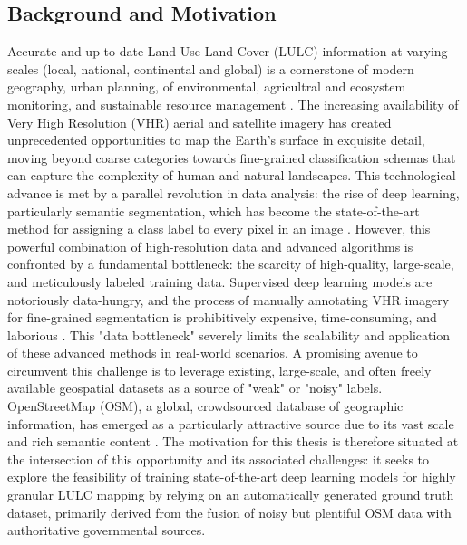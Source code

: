 \documentclass{report}
\begin{document}
\subsection{Background and Motivation}
Accurate and up-to-date Land Use Land Cover (LULC) information at varying scales (local, national, continental and global) is a cornerstone of modern geography, urban planning, of environmental, agricultral and ecosystem monitoring, and sustainable resource management \parencites[p.~2;]{TalukdarEtAlLandUseLandCoverClassificationMachineLearningClassifiersSatelliteObservationsReview2020}[p.~47]{KandzioraEtAlMappingprovisioningecosystemserviceslocalscaleusingdatavaryingspatialtemporalresolution2013}. The increasing availability of Very High Resolution (VHR) aerial and satellite imagery has created unprecedented opportunities to map the Earth's surface in exquisite detail, moving beyond coarse categories towards fine-grained classification schemas that can capture the complexity of human and natural landscapes. This technological advance is met by a parallel revolution in data analysis: the rise of deep learning, particularly semantic segmentation, which has become the state-of-the-art method for assigning a class label to every pixel in an image \parencite[p.~311f.]{KotaridisLazaridouRemotesensingimagesegmentationadvancesmetaanalysis2021a}.
However, this powerful combination of high-resolution data and advanced algorithms is confronted by a fundamental bottleneck: the scarcity of high-quality, large-scale, and meticulously labeled training data. Supervised deep learning models are notoriously data-hungry, and the process of manually annotating VHR imagery for fine-grained segmentation is prohibitively expensive, time-consuming, and laborious \parencite[p.~1]{KaiserEtAlLearningAerialImageSegmentationOnlineMaps2017}. This "data bottleneck" severely limits the scalability and application of these advanced methods in real-world scenarios.
A promising avenue to circumvent this challenge is to leverage existing, large-scale, and often freely available geospatial datasets as a source of "weak" or "noisy" labels. OpenStreetMap (OSM), a global, crowdsourced database of geographic information, has emerged as a particularly attractive source due to its vast scale and rich semantic content \parencite[p.~2]{UsmaniEtAlRemoteSensingDeepLearningUnderstandNoisyOpenStreetMap2023}. The motivation for this thesis is therefore situated at the intersection of this opportunity and its associated challenges: it seeks to explore the feasibility of training state-of-the-art deep learning models for highly granular LULC mapping by relying on an automatically generated ground truth dataset, primarily derived from the fusion of noisy but plentiful OSM data with authoritative governmental sources.
\end{document}
